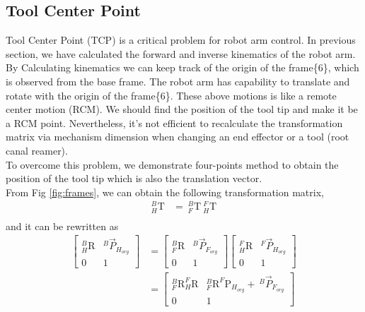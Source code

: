 \subsection{Tool Center Point}
\label{sec:tcp}
Tool Center Point (TCP) is a critical problem for robot arm control. In previous section, we have calculated the forward and inverse kinematics of the robot arm. By Calculating kinematics we can keep track of the origin of the frame\{6\}, which is observed from the base frame. The robot arm has capability to translate and rotate with the origin of the frame\{6\}. These above motions is like a remote center motion (RCM). We should find the position of the tool tip and make it be a RCM point. Nevertheless, it's not efficient to recalculate the transformation matrix via mechanism dimension when changing an end effector or a tool (root canal reamer).\\
To overcome this problem, we demonstrate four-points method to obtain the position of the tool tip which is also the translation vector.\\
From Fig \ref{fig:frames}, we can obtain the following transformation matrix,
\begin{equation}
\begin{split}
_{H}^{B}\textrm{T} &=\  _{F}^{B}\textrm{T}\ _{H}^{F}\textrm{T}\\
\end{split}
\end{equation}		
and it can be rewritten as
\begin{equation}
\begin{split}																												
\begin{bmatrix}
_{H}^{B}\textrm{R} & ^{B}\vec{P}_{H_{org}}\\ 
0 & 1
\end{bmatrix} &=
\begin{bmatrix}
_{F}^{B}\textrm{R} & ^{B}\vec{P}_{F_{org}}\\ 
0 & 1
\end{bmatrix}
\begin{bmatrix}
_{H}^{F}\textrm{R} & ^{F}\vec{P}_{H_{org}}\\ 
0 & 1
\end{bmatrix}\\
&= 
\begin{bmatrix}
_{F}^{B}\textrm{R}_{H}^{F}\textrm{R} & _{F}^{B}\textrm{R}^{F}\textrm{P}_{H_{org}} +\ ^{B}\vec{P}_{F_{org}}\\ 
0 & 1
\end{bmatrix}\\
\end{split}
\end{equation}
